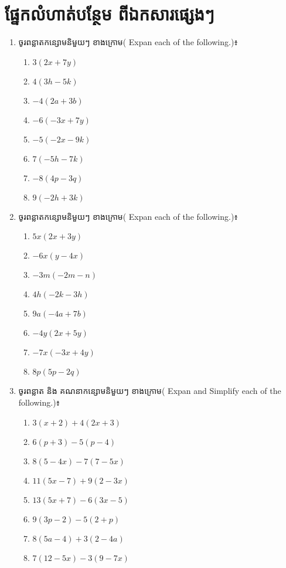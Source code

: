 \section{ផ្នែកលំហាត់បន្ថែម ពីឯកសារផ្សេងៗ}
\begin{enumerate}
\item ចូរពន្លាតកន្សោមនិមួយៗ ខាងក្រោម( Expan each of the following.)៖
\begin{multicols}{4}
\begin{enumerate}[label=\alph*.]
\item $3(2x+7y)$
\item $4(3h-5k)$
\item $-4(2a+3b)$
\item $-6(-3x+7y)$
\item $-5(-2x-9k)$
\item $7(-5h-7k)$
\item $-8(4p-3q)$
\item $9(-2h+3k)$
\end{enumerate}
\end{multicols}

\item  ចូរពន្លាតកន្សោមនិមួយៗ ខាងក្រោម( Expan each of the following.)៖
\begin{multicols}{3}
\begin{enumerate}[label=\alph*.]
\item $5x(2x+3y)$
\item $-6x(y-4x)$
\item $-3m(-2m-n)$
\item $4h(-2k-3h)$
\item $9a(-4a+7b)$
\item $-4y(2x+5y)$
\item $-7x(-3x+4y)$
\item $8p(5p-2q)$
\end{enumerate}
\end{multicols}

\item  ចូរពន្លាត និង គណនាកន្សោមនិមួយៗ ខាងក្រោម( Expan and Simplify  each of the following.)៖
\begin{multicols}{2}
\begin{enumerate}[label=\alph*.]
\item $3(x+2)+4(2x+3)$
\item $6(p+3)-5(p-4)$
\item $8(5-4x)-7(7-5x)$
\item $11(5x-7)+9(2-3x)$
\item $13(5x+7)-6(3x-5)$
\item $9(3p-2)-5(2+p)$
\item $8(5a-4)+3(2-4a)$
\item $7(12-5x)-3(9-7x)$
\end{enumerate}
\end{multicols}


\end{enumerate}
